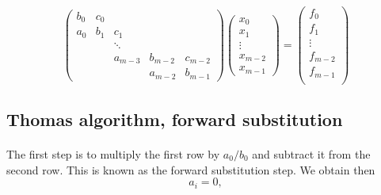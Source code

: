 \documentclass[%
oneside,                 %
final,                   %
10pt]{article}
\begin{document}
\paragraph{}
\[
\left( \begin{array}{ccccc}
        b_0 & c_0 &        &         &         \\
	a_0 &  b_1 &  c_1    &         &         \\
	   &    & \ddots  &         &         \\
	      &	    & a_{m-3} & b_{m-2} & c_{m-2} \\
	         &    &         & a_{m-2} & b_{m-1}
   \end{array} \right)
\left( \begin{array}{c}
       x_0     \\
       x_1     \\
       \vdots  \\
       x_{m-2} \\
       x_{m-1}
   \end{array} \right)=\left( \begin{array}{c}
       f_0     \\
       f_1     \\
       \vdots  \\
       f_{m-2} \\
       f_{m-1} \\
   \end{array} \right)
\]



\subsection{Thomas algorithm, forward substitution}

\paragraph{}
The first step is to multiply the first row by $a_0/b_0$ and subtract it from the second row.  This is known as the forward substitution step. We obtain then
\[
	a_i = 0,
\]
\end{document}
